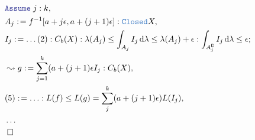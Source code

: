 \documentclass[12pt]{scrartcl}
\newcommand{\TYPE}[1]{\textcolor{NavyBlue}{\mathtt{#1}}}
\newcommand{\LOGIC}[1]{\textcolor{Blue}{\mathtt{#1}}}
\renewcommand{\.}{\; . \;}
\newcommand{\de}{: \kern 0.1pc =}
\renewcommand{\c}{\complement}
\newcommand{\Say}[3]{& #1 \de #2 : #3, \\}
\newcommand{\Conclude}[3]{& #1 \de #2 : #3; \\}
\newcommand{\Derive}[3]{& \leadsto #1 \de #2 : #3, \\}
\newcommand{\A}{\LOGIC{Assume} \;}
\newcommand{\Assume}[2]{& \A #1 : #2, \\}
\newcommand{\QED}{\; \square}
\newcommand{\EndProof}{& \QED \\}
\begin{document}
\newpage
\begin{align*}
\Assume{j }{ k }
\Say{A_j}{ f^{-1}[ a + j\epsilon, a + (j + 1)\epsilon ] }{\TYPE{Closed}{X}}
\Conclude{I_j}{ \ldots(2) }{C_b(X) : \lambda(A_j) \le  \int_{A_j} I_j \, \mathrm{d} \lambda  \le \lambda(A_j) + \epsilon : \int_{A_j^\c} I_j \, \mathrm{d} \lambda \le \epsilon } 
\Derive{g}{ \sum^k_{j = 1} ( a + (j + 1 )\epsilon I_j }{C_b(X)}
\Say{ (5) }{ \ldots }{ L(f) \le L(g) = \sum_j^k (a + (j + 1)\epsilon)L(I_j)   }
& \ldots \\
\EndProof
\end{align*}  
\end{document}
